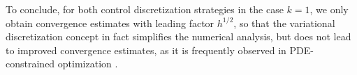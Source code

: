 \documentclass[a4paper,10pt]{article}
\numberwithin{theorem}{section}
\newcommand{\z}[2][blue]{#2}
\begin{document}
\z{To conclude, for both control discretization strategies in the case $k=1$, we only obtain convergence estimates with leading factor $h^{1/2}$, so that the variational discretization concept in fact simplifies the numerical analysis, but does not lead to improved convergence estimates, as it is frequently observed in PDE-constrained optimization \cite[Chapter 3]{MHinze_RPinnau_MUlbrich_SUlbrich_2009a}.} 
\end{document}
